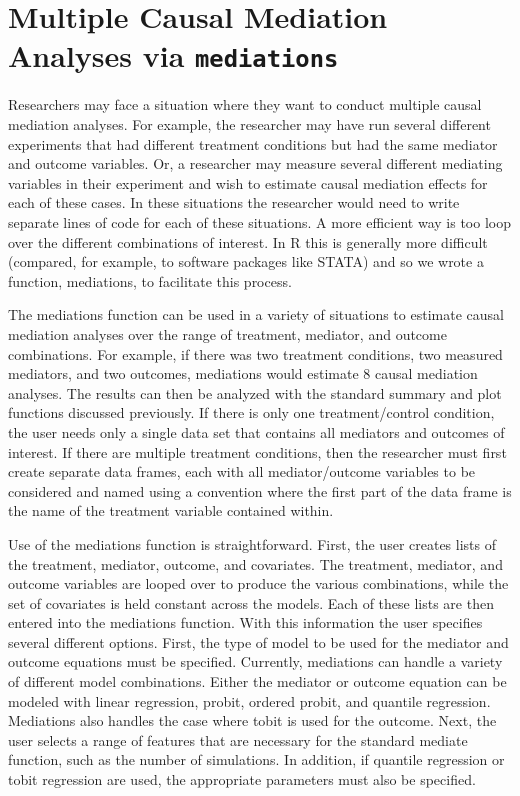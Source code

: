 \documentclass[11pt,letterpaper]{article}
\theoremstyle{plain}
\begin{document}
\section{Multiple Causal Mediation Analyses via {\tt mediations}}
\label{sec:mediations}
Researchers may face a situation where they want to conduct multiple causal mediation analyses. For example, the researcher may have run several different experiments that had different treatment conditions but had the same mediator and outcome variables. Or, a researcher may measure several different mediating variables in their experiment and wish to estimate causal mediation effects for each of these cases. In these situations the researcher would need to write separate lines of code for each of these situations. A more efficient way is too loop over the different combinations of interest. In R this is generally more difficult (compared, for example, to software packages like STATA) and so we wrote a function, mediations, to facilitate this process.

The mediations function can be used in a variety of situations to estimate causal mediation analyses over the range of treatment, mediator, and outcome combinations. For example, if there was two treatment conditions, two measured mediators, and two outcomes, mediations would estimate 8 causal mediation analyses. The results can then be analyzed with the standard summary and plot functions discussed previously. If there is only one treatment/control condition, the user needs only a single data set that contains all mediators and outcomes of interest. If there are multiple treatment conditions, then the researcher must first create separate data frames, each with all mediator/outcome variables to be considered and named using a convention where the first part of the data frame is the name of the treatment variable contained within.

Use of the mediations function is straightforward. First, the user creates lists of the treatment, mediator, outcome, and covariates. The treatment, mediator, and outcome variables are looped over to produce the various combinations, while the set of covariates is held constant across the models. Each of these lists are then entered into the mediations function. With this information the user specifies several different options. First, the type of model to be used for the mediator and outcome equations must be specified. Currently, mediations can handle a variety of different model combinations. Either the mediator or outcome equation can be modeled with linear regression, probit, ordered probit, and quantile regression. Mediations also handles the case where tobit is used for the outcome. Next, the user selects a range of features that are necessary for the standard mediate function, such as the number of simulations. In addition, if quantile regression or tobit regression are used, the appropriate parameters must also be specified.
\end{document}
